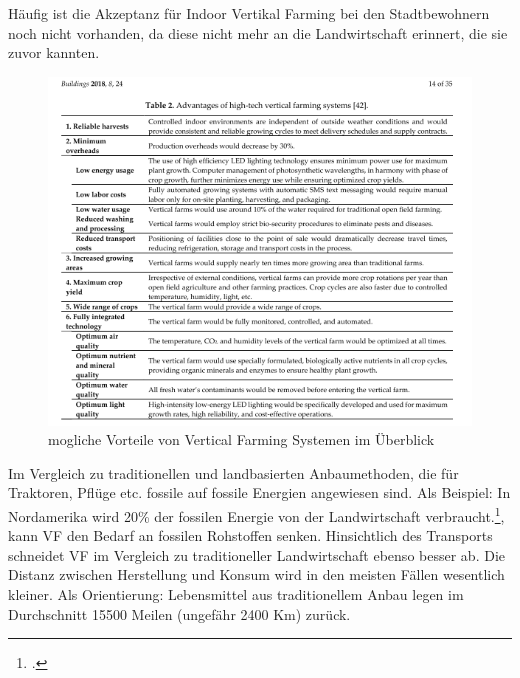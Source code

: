 \documentclass{scrartcl}
\begin{document}
Häufig ist die Akzeptanz für Indoor Vertikal Farming bei den Stadtbewohnern noch nicht vorhanden, da diese nicht mehr an die Landwirtschaft erinnert, die sie zuvor kannten.


\begin{figure}[htbp]
\centering
\includegraphics[width=14cm]{image_folder/moglicheVorteileVonVF.png}
\caption{mogliche Vorteile von Vertical Farming Systemen im Überblick}
\label{fig:vorteileVF}
\end{figure}

Im Vergleich zu traditionellen und landbasierten Anbaumethoden, die für Traktoren, Pflüge etc. fossile auf fossile Energien angewiesen sind. Als Beispiel: In Nordamerika wird 20\% der fossilen Energie von der Landwirtschaft verbraucht.\footcite[Vgl.][S.27]{Al-Kodmany2018TheCity[82,83}, kann VF den Bedarf an fossilen Rohstoffen senken.
Hinsichtlich des Transports schneidet VF im Vergleich zu traditioneller Landwirtschaft ebenso besser ab. Die Distanz zwischen Herstellung und Konsum wird in den meisten Fällen wesentlich kleiner. Als Orientierung: Lebensmittel aus traditionellem Anbau legen im Durchschnitt 15500 Meilen (ungefähr 2400 Km) zurück.
\end{document}
